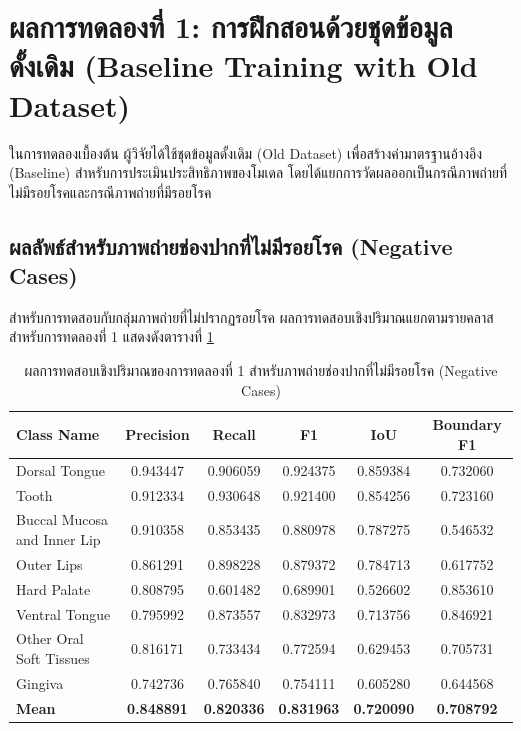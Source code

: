 \section{ผลการทดลองที่ 1: การฝึกสอนด้วยชุดข้อมูลดั้งเดิม (Baseline Training with Old Dataset)}
ในการทดลองเบื้องต้น ผู้วิจัยได้ใช้ชุดข้อมูลดั้งเดิม (Old Dataset) เพื่อสร้างค่ามาตรฐานอ้างอิง (Baseline) สำหรับการประเมินประสิทธิภาพของโมเดล โดยได้แยกการวัดผลออกเป็นกรณีภาพถ่ายที่ไม่มีรอยโรคและกรณีภาพถ่ายที่มีรอยโรค

\subsection{ผลลัพธ์สำหรับภาพถ่ายช่องปากที่ไม่มีรอยโรค (Negative Cases)}
สำหรับการทดสอบกับกลุ่มภาพถ่ายที่ไม่ปรากฏรอยโรค ผลการทดสอบเชิงปริมาณแยกตามรายคลาสสำหรับการทดลองที่ 1 แสดงดังตารางที่ \ref{tab:eval_baseline_old_dataset_negative}

\begin{table}[H]
\centering
\caption{ผลการทดสอบเชิงปริมาณของการทดลองที่ 1 สำหรับภาพถ่ายช่องปากที่ไม่มีรอยโรค (Negative Cases)}
\label{tab:eval_baseline_old_dataset_negative}
\begin{tabular}{|l|c|c|c|c|c|}
\hline
\textbf{Class Name} & \textbf{Precision} & \textbf{Recall} & \textbf{F1} & \textbf{IoU} & \textbf{Boundary F1} \\ \hline
Dorsal Tongue & 0.943447 & 0.906059 & 0.924375 & 0.859384 & 0.732060 \\
Tooth & 0.912334 & 0.930648 & 0.921400 & 0.854256 & 0.723160 \\
Buccal Mucosa and Inner Lip & 0.910358 & 0.853435 & 0.880978 & 0.787275 & 0.546532 \\
Outer Lips & 0.861291 & 0.898228 & 0.879372 & 0.784713 & 0.617752 \\
Hard Palate & 0.808795 & 0.601482 & 0.689901 & 0.526602 & 0.853610 \\
Ventral Tongue & 0.795992 & 0.873557 & 0.832973 & 0.713756 & 0.846921 \\
Other Oral Soft Tissues & 0.816171 & 0.733434 & 0.772594 & 0.629453 & 0.705731 \\
Gingiva & 0.742736 & 0.765840 & 0.754111 & 0.605280 & 0.644568 \\ \hline
\textbf{Mean} & \textbf{0.848891} & \textbf{0.820336} & \textbf{0.831963} & \textbf{0.720090} & \textbf{0.708792} \\ \hline
\end{tabular}
\end{table}

